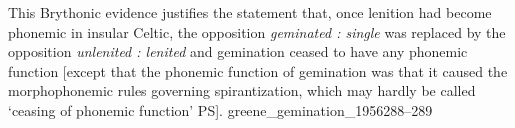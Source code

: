 {This Brythonic evidence justifies the statement that, once lenition had become phonemic in insular Celtic, the opposition \textit{geminated : single} was replaced by the opposition \textit{unlenited : lenited} and gemination ceased to have any phonemic function [except that the phonemic function of gemination was that it caused the morphophonemic rules governing spirantization, which may hardly be called `ceasing of phonemic function' PS].
}{greene_gemination_1956}{288--289}

